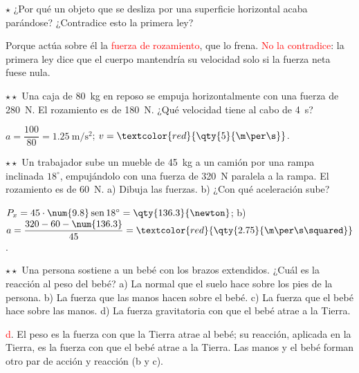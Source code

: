 \begin{exercise}
    \(\star\) ¿Por qué un objeto que se desliza por una superficie horizontal acaba parándose? ¿Contradice esto la primera ley?
    \begin{solu}
        Porque actúa sobre él la \textcolor{red}{fuerza de rozamiento}, que lo frena. \textcolor{red}{No la contradice}: la primera
        ley dice que el cuerpo mantendría su velocidad solo si la fuerza neta fuese nula.
    \end{solu}
\end{exercise}

\begin{exercise}
    \(\star\star\) Una caja de \qty{80}{\kg} en reposo se empuja horizontalmente con una fuerza de \qty{280}{\newton}. El
    rozamiento es de \qty{180}{\newton}. ¿Qué velocidad tiene al cabo de \qty{4}{\s}?
    \begin{solu}
        \(a = \dfrac{100}{80} = \qty{1.25}{\m\per\s\squared}\); \(v = \textcolor{red}{\qty{5}{\m\per\s}}\).
    \end{solu}
\end{exercise}

\begin{exercise}
    \(\star\star\) Un trabajador sube un mueble de \qty{45}{\kg} a un camión por una rampa inclinada \(18^\circ\), empujándolo con
    una fuerza de \qty{320}{\newton} paralela a la rampa. El rozamiento es de \qty{60}{\newton}. a) Dibuja las fuerzas. b) ¿Con qué
    aceleración sube?
    \begin{solu}
        \(P_x = 45 \cdot \num{9.8}\sen 18^\circ = \qty{136.3}{\newton}\); b) \(a = \dfrac{320 - 60 - \num{136.3}}{45} =
        \textcolor{red}{\qty{2.75}{\m\per\s\squared}}\).
    \end{solu}
\end{exercise}

\begin{exercise}
    \(\star\star\) Una persona sostiene a un bebé con los brazos extendidos. ¿Cuál es la reacción al peso del bebé? a) La normal que
    el suelo hace sobre los pies de la persona. b) La fuerza que las manos hacen sobre el bebé. c) La fuerza que el bebé hace sobre las
    manos. d) La fuerza gravitatoria con que el bebé atrae a la Tierra.
    \begin{solu}
        \textcolor{red}{d}. El peso es la fuerza con que la Tierra atrae al bebé; su reacción, aplicada en la Tierra, es la fuerza con
        que el bebé atrae a la Tierra. Las manos y el bebé forman otro par de acción y reacción (b y c).
    \end{solu}
\end{exercise}

